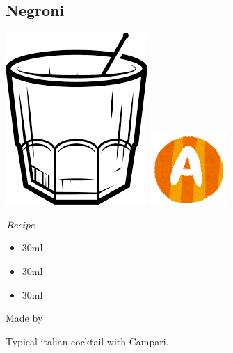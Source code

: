 \subsection{Negroni}
\vspace{-7.5mm}
\hspace{32mm}
\includegraphics[scale=.06]{cocktail_glass_rock.png}
\includegraphics[scale=.12]{capital_a.png}
\vspace{2.5mm}
\begin{itembox}[l]{\boldmath $Recipe$}
\begin{itemize}
\setlength{\parskip}{0cm}
\setlength{\itemsep}{0cm}
\item \gin 30ml
\item \campari 30ml
\item \svermouth 30ml
\end{itemize}
\vspace{-4mm}
Made by \build
\end{itembox}
Typical italian cocktail with Campari.
